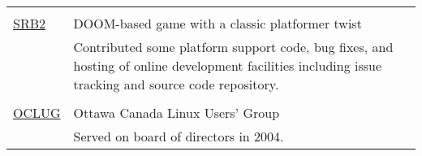 \documentclass[letterpaper,10pt]{article}
\begin{document}
\begin{longtable}{p{3cm}|p{12cm}}
  \multicolumn{2}{c}{} \\
  \textsc{\href{http://www.srb2.org}{SRB2}} & DOOM-based game with a classic platformer twist \\
   & \footnotesize{Contributed some platform support code, bug fixes, and hosting of online development facilities including issue tracking and source code repository.} \\
  \multicolumn{2}{c}{} \\
  \textsc{\href{http://www.oclug.on.ca}{OCLUG}} & Ottawa Canada Linux Users' Group \\
   & \footnotesize{Served on board of directors in 2004.}
\end{longtable}
\end{document}
